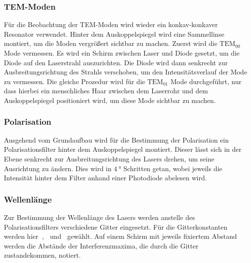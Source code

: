 \subsubsection{TEM-Moden}
Für die Beobachtung der TEM-Moden wird wieder ein konkav-konkaver Resonator verwendet. Hinter dem Auskoppelspiegel wird eine Sammellinse montiert, um die Moden
vergrößert sichtbar zu machen. Zuerst wird die $\text{TEM}_{00} $ Mode vermessen. Es wird ein Schirm zwischen Laser und Diode gesetzt, um die Diode auf den Laserstrahl auszurichten. 
Die Diode wird dann senkrecht zur Ausbreitungsrichtung des Strahls verschoben, um den Intensitätsverlauf der Mode zu vermessen. 
Die gleiche Prozedur wird für die $\text{TEM}_{01} $ Mode durchgeführt, nur dass hierbei ein menschliches Haar zwischen dem Laserrohr und dem Auskoppelspiegel positioniert wird, um 
diese Mode sichtbar zu machen. 

\subsubsection{Polarisation}
Ausgehend vom Grundaufbau wird für die Bestimmung der Polarisation ein Polarisationsfilter hinter dem Auskoppelspiegel montiert. Dieser lässt sich in der Ebene senkrecht zur 
Ausbreitungsrichtung des Lasers drehen, um seine Ausrichtung zu ändern. Dies wird in $\SI{4}{\degree}$ Schritten getan, wobei jeweils die Intensität hinter dem Filter anhand einer 
Photodiode abelesen wird. 

\subsubsection{Wellenlänge}
Zur Bestimmung der Wellenlänge des Lasers werden anstelle des Polarisationsfilters verschiedene Gitter eingesetzt. Für die Gitterkonstanten werden hier $\SI{}{}$, $\SI{}{}$ und 
$\SI{}{}$ gewählt. Auf einem Schirm mit jeweils fixiertem Abstand werden die Abstände der Interferenzmaxima, die durch die Gitter zustandekommen, notiert. 
